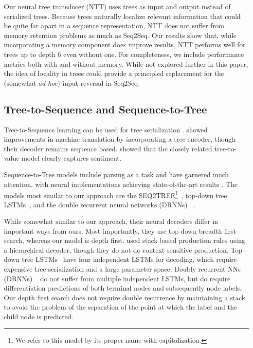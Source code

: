 \documentclass{article}
\begin{document}
Our neural tree transducer (NTT) uses trees as input and output instead of serialized trees.  Because trees naturally localize relevant information that could be quite far apart in a sequence representation, NTT does not suffer from memory retention problems as much as Seq2Seq.  Our results show that, while incorporating a memory component does improve results, NTT performs well for trees up to depth 6 even without one.  For completeness, we include performance metrics both with and without memory.  While not explored further in this paper, the idea of locality in trees could provide a principled replacement for the (somewhat {\it ad hoc}) input reversal in Seq2Seq.


\subsection{Tree-to-Sequence and Sequence-to-Tree}
Tree-to-Sequence learning can be used for tree serialization \citep{eriguchi2016tree,eriguchi2016character}.  \citet{chen2017improved} showed improvements in machine translation by incorporating a tree encoder, though their decoder remains sequence based. \citet{Socher2011-nx} showed that the closely related tree-to-value model clearly captures sentiment.

Sequence-to-Tree models include parsing as a task and have garnered much attention, with neural implementations achieving state-of-the-art results \citep{aharoni2017towards}.  The models most similar to our approach are the SEQ2TREE\footnote{We refer to this model by its proper name with capitalization.}~\citep{Dong2016-qq}, top-down tree LSTMs~\citep{Zhang2015-bg}, and the double recurrent neural networks (DRNNs) ~\citep{alvarez2017tree}. 

While somewhat similar to our approach, their neural decoders differ in important ways from ours. Most importantly, they use top down breadth first search, whereas our model is depth first.  \citet{Dong2016-qq} used stack based production rules using a hierarchical decoder, though they do not do context sensitive production. Top-down tree LSTMs~\citep{Zhang2015-bg} have four independent LSTMs for decoding, which require expensive tree serialization and a large parameter space. Doubly recurrent NNs (DRNNs) ~\citep{alvarez2017tree} do not suffer from multiple independent LSTMs, but do require differentiation predictions of both terminal nodes and subsequently node labels.  Our depth first search does not require double recurrence by maintaining a stack to avoid the problem of the separation of the point at which the label and the child node is predicted. 
\end{document}
